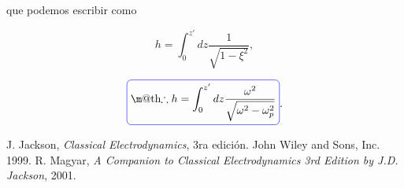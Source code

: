 \documentclass[a4paper,11pt]{article}
\makeatletter
\numberwithin{equation}{section}
\newcommand*{\boxcolor}{blue}
\renewcommand{\boxed}[1]{\textcolor{\boxcolor}{%
\tikz[baseline={([yshift=-1ex]current bounding box.center)}] \node [rectangle, minimum width=1ex,rounded corners,draw] {\normalcolor\m@th$\displaystyle#1$};}}
\makeatother
\begin{document}
que podemos escribir como

\begin{equation}
 h = \int_0^{z'} dz \frac{1}{\sqrt{1 - \xi^2}},
\end{equation}

\begin{equation}
 \boxed{\therefore h = \int_0^{z'} dz \frac{\omega^2}{\sqrt{\omega^2 - \omega_p^2}}}.
\end{equation}

\newpage

\begin{thebibliography}{10}
J. Jackson, \emph{Classical Electrodynamics}, 3ra edición. John Wiley and Sons, Inc. 
1999.
R. Magyar, \emph{A Companion to Classical Electrodynamics 3rd Edition by J.D. 
Jackson}, 2001.
\end{thebibliography}
\end{document}
